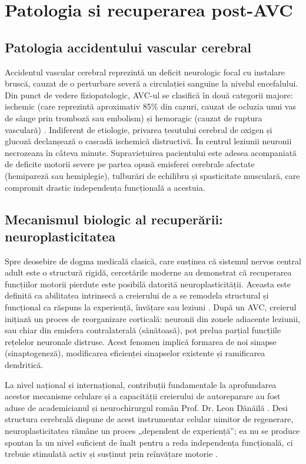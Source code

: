 \chapter{Patologia si recuperarea post-AVC}

\section{Patologia accidentului vascular cerebral}
\hspace{0.75cm}Accidentul vascular cerebral reprezintă un deficit neurologic focal cu instalare bruscă, cauzat de o perturbare severă 
a circulației sanguine la nivelul encefalului. Din punct de vedere fiziopatologic, AVC-ul se clasifică în două categorii 
majore: ischemic (care reprezintă aproximativ 85\% din cazuri, cauzat de ocluzia unui vas de sânge prin tromboză sau embolism)
și hemoragic (cauzat de ruptura vasculară) \cite{stroke_patho_2020}. Indiferent de etiologie, privarea țesutului cerebral de
oxigen și glucoză declanșează o cascadă ischemică distructivă. În centrul leziunii neuronii 
necrozeaza în câteva minute. Supraviețuirea pacientului este adesea acompaniată
de deficite motorii severe pe partea opusă emisferei cerebrale afectate (hemipareză sau hemiplegie), tulburări de echilibru 
și spasticitate musculară, care compromit drastic independența funcțională a acestuia.

\section{Mecanismul biologic al recuperării: neuroplasticitatea}

\hspace{0.75cm}Spre deosebire de dogma medicală clasică, care susținea că sistemul nervos central adult este o structură rigidă, cercetările
moderne au demonstrat că recuperarea funcțiilor motorii pierdute este posibilă datorită neuroplasticității. Aceasta este definită ca 
abilitatea intrinsecă a creierului de a se remodela structural și funcțional ca răspuns la experiență, învățare sau leziuni \cite{kleim_jones_2008}.
După un AVC, creierul inițiază un proces de reorganizare corticală: neuronii din zonele adiacente leziunii, sau chiar din emisfera 
contralaterală (sănătoasă), pot prelua parțial funcțiile rețelelor neuronale distruse. Acest fenomen implică formarea de noi sinapse 
(sinaptogeneză), modificarea eficienței sinapselor existente și ramificarea dendritică.

\hspace{0.75cm}La nivel național și internațional, contribuții fundamentale la aprofundarea acestor mecanisme
celulare și a capacității creierului de autoreparare 
au fost aduse de academicianul și neurochirurgul român Prof. Dr. Leon Dănăilă \cite{danaila_2023}.
Desi structura cerebrală dispune de acest instrumentar celular uimitor de regenerare, neuroplasticitatea rămâne un proces
„dependent de experiență”; ea nu se produce spontan
la un nivel suficient de înalt pentru a reda independența funcțională, ci trebuie stimulată activ
și susținut prin reînvățare motorie \cite{cramer_2011}.

